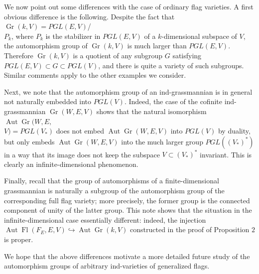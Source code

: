 \documentclass[11pt,twoside]{gsp}
\begin{document}
We now point out some differences with the case of ordinary flag varieties. A first obvious difference is the following. Despite the fact that $\operatorname{Gr}(k,V)=PGL(E,V)$/\\$P_k$, where $P_k$ is the stabilizer in $PGL(E,V)$ of a $k$-dimensional subspace of $V$, the automorphism group of $\operatorname{Gr}(k,V)$ is much larger than $PGL(E,V)$. Therefore $\operatorname{Gr}(k,V)$ is a quotient of any subgroup $G$ satisfying $PGL(E,V)\subset G\subset PGL(V)$, and there is quite a variety of such subgroups. Similar comments apply to the other examples we consider.

Next, we note that the automorphism group of an ind-grassmannian is in general not naturally embedded into $PGL(V)$. Indeed, the case of the cofinite ind-grassmannian $\operatorname{Gr}(W,E,V)$ shows that the natural isomorphism $\operatorname{Aut}\operatorname{Gr}(W,E,$\\$V)= PGL(V_*)$ does not embed $\operatorname{Aut}\operatorname{Gr}(W,E,V)$ into $PGL(V)$ by duality, but only embeds $\operatorname{Aut}\operatorname{Gr}(W,E,V)$ into the much larger group $PGL((V_*)^*)$ in a way that its image does not keep the subspace $V\subset(V_*)^*$ invariant. This is  clearly an infinite-dimensional phenomenon.


Finally, recall that the group of automorphisms of a finite-dimensional grassmannian is naturally a subgroup of the automorphism group of the corresponding full flag variety; more precisely, the former group is the connected component of unity of the latter group. This note shows that the situation in the infinite-dimensional case essentially different:   
indeed, the injection $\operatorname{Aut}\operatorname{Fl}(F_E,E,V)\hookrightarrow \operatorname{Aut}\operatorname{Gr}(k,V)$ constructed in the proof of Proposition $2$ is proper. 

We hope that the above differences motivate a more detailed future study of the automorphism groups of arbitrary ind-varieties of generalized flags.
\end{document}
